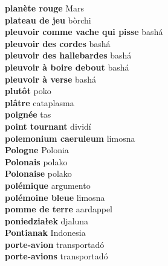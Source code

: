 \textbf{ planète rouge  } Mars \\
\textbf{ plateau de jeu  } bòrchi \\
\textbf{ pleuvoir comme vache qui pisse  } bashá \\
\textbf{ pleuvoir des cordes  } bashá \\
\textbf{ pleuvoir des hallebardes  } bashá \\
\textbf{ pleuvoir à boire debout  } bashá \\
\textbf{ pleuvoir à verse  } bashá \\
\textbf{ plutôt  } poko \\
\textbf{ plâtre  } cataplasma \\
\textbf{ poignée  } tas \\
\textbf{ point tournant  } dividí \\
\textbf{ polemonium caeruleum  } limosna \\
\textbf{ Pologne  } Polonia \\
\textbf{ Polonais  } polako \\
\textbf{ Polonaise  } polako \\
\textbf{ polémique  } argumento \\
\textbf{ polémoine bleue  } limosna \\
\textbf{ pomme de terre  } aardappel \\
\textbf{ poniedziałek  } djaluna \\
\textbf{ Pontianak  } Indonesia \\
\textbf{ porte-avion  } transportadó \\
\textbf{ porte-avions  } transportadó \\
